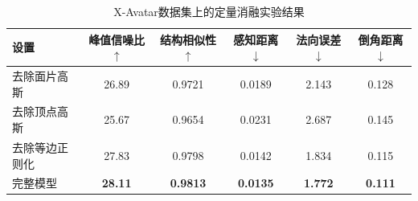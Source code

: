 \begin{table}[htbp]
	\centering\small
	\caption{X-Avatar数据集上的定量消融实验结果}
	\label{tab:ablation}
	\renewcommand{\arraystretch}{1.2} 
	\setlength{\tabcolsep}{4pt}
	\begin{tabular}{lccc|cc}
		\toprule
		设置
		& 峰值信噪比$\uparrow$ & 结构相似性$\uparrow$ & 感知距离$\downarrow$ & 法向误差$\downarrow$ & 倒角距离$\downarrow$ \\
		\midrule
		去除面片高斯
		& 26.89  & 0.9721  & 0.0189   & 2.143    & 0.128      \\
		
		去除顶点高斯
		& 25.67   & 0.9654 & 0.0231  & 2.687  & 0.145      \\
		
		去除等边正则化 & 27.83    & 0.9798 & 0.0142   & 1.834    & 0.115   \\
		
		完整模型
		& \textbf{28.11} & \textbf{0.9813}  & \textbf{0.0135} & \textbf{1.772}  & \textbf{0.111} \\
		\bottomrule
	\end{tabular}
\end{table}
